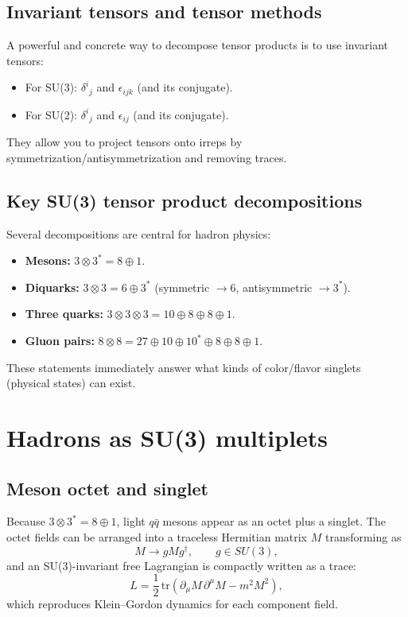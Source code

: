 \subsection{Invariant tensors and tensor methods}
A powerful and concrete way to decompose tensor products is to use invariant tensors:
\begin{itemize}
  \item For SU(3): $\delta^i{}_j$ and $\epsilon_{ijk}$ (and its conjugate).
  \item For SU(2): $\delta^i{}_j$ and $\epsilon_{ij}$ (and its conjugate).
\end{itemize}
They allow you to project tensors onto irreps by symmetrization/antisymmetrization and removing traces.

\subsection{Key SU(3) tensor product decompositions}
Several decompositions are central for hadron physics:
\begin{itemize}
  \item \textbf{Mesons:} $3\otimes 3^* = 8\oplus 1$.
  \item \textbf{Diquarks:} $3\otimes 3 = 6 \oplus 3^*$ (symmetric $\to 6$, antisymmetric $\to 3^*$).
  \item \textbf{Three quarks:} $3\otimes 3\otimes 3 = 10\oplus 8\oplus 8\oplus 1$.
  \item \textbf{Gluon pairs:} $8\otimes 8 = 27\oplus 10\oplus 10^*\oplus 8\oplus 8\oplus 1$.
\end{itemize}
These statements immediately answer what kinds of color/flavor singlets (physical states) can exist.

\section{Hadrons as SU(3) multiplets}
\subsection{Meson octet and singlet}
Because $3\otimes 3^* = 8\oplus 1$, light $q\bar q$ mesons appear as an octet plus a singlet. The octet fields can be arranged into a traceless Hermitian matrix $M$ transforming as
\[
M \to gMg^\dagger,\qquad g\in SU(3),
\]
and an SU(3)-invariant free Lagrangian is compactly written as a trace:
\[
L=\frac12\,\mathrm{tr}\!\left(\partial_\mu M\,\partial^\mu M - m^2 M^2\right),
\]
which reproduces Klein--Gordon dynamics for each component field.

